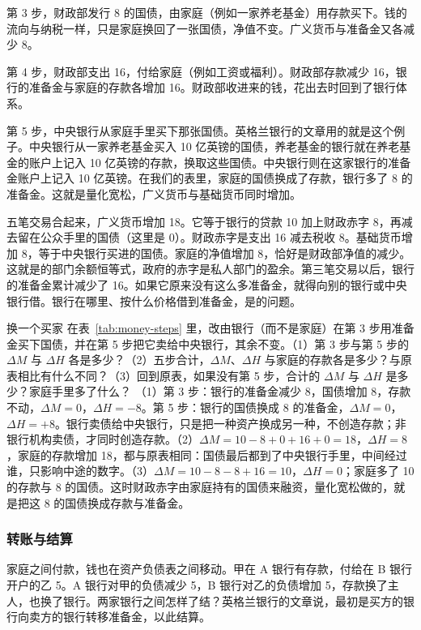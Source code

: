 第 3 步，财政部发行 8 的国债，由家庭（例如一家养老基金）用存款买下。钱的流向与纳税一样，只是家庭换回了一张国债，净值不变。广义货币与准备金又各减少 8。

第 4 步，财政部支出 16，付给家庭（例如工资或福利）。财政部存款减少 16，银行的准备金与家庭的存款各增加 16。财政部收进来的钱，花出去时回到了银行体系。

第 5 步，中央银行从家庭手里买下那张国债。英格兰银行的文章用的就是这个例子。中央银行从一家养老基金买入 10 亿英镑的国债，养老基金的银行就在养老基金的账户上记入 10 亿英镑的存款，换取这些国债。中央银行则在这家银行的准备金账户上记入 10 亿英镑\cite{mcleay2014}。在我们的表里，家庭的国债换成了存款，银行多了 8 的准备金。这就是量化宽松，广义货币与基础货币同时增加。

五笔交易合起来，广义货币增加 18。它等于银行的贷款 10 加上财政赤字 8，再减去留在公众手里的国债（这里是 0）。财政赤字是支出 16 减去税收 8。基础货币增加 8，等于中央银行买进的国债。家庭的净值增加 8，恰好是财政部净值的减少。这就是的部门余额恒等式，政府的赤字是私人部门的盈余。第三笔交易以后，银行的准备金累计减少了 16。如果它原来没有这么多准备金，就得向别的银行或中央银行借。银行在哪里、按什么价格借到准备金，是的问题。

\begin{example}{换一个买家}\label{ex:money-tax}
在表~\ref{tab:money-steps} 里，改由银行（而不是家庭）在第 3 步用准备金买下国债，并在第 5 步把它卖给中央银行，其余不变。（1）第 3 步与第 5 步的 $\Delta M$ 与 $\Delta H$ 各是多少？（2）五步合计，$\Delta M$、$\Delta H$ 与家庭的存款各是多少？与原表相比有什么不同？（3）回到原表，如果没有第 5 步，合计的 $\Delta M$ 与 $\Delta H$ 是多少？家庭手里多了什么？
\solution （1）第 3 步：银行的准备金减少 8，国债增加 8，存款不动，$\Delta M=0$，$\Delta H=-8$。第 5 步：银行的国债换成 8 的准备金，$\Delta M=0$，$\Delta H=+8$。银行卖债给中央银行，只是把一种资产换成另一种，不创造存款；非银行机构卖债，才同时创造存款。（2）$\Delta M=10-8+0+16+0=18$，$\Delta H=8$，家庭的存款增加 18，都与原表相同：国债最后都到了中央银行手里，中间经过谁，只影响中途的数字。（3）$\Delta M=10-8-8+16=10$，$\Delta H=0$；家庭多了 10 的存款与 8 的国债。这时财政赤字由家庭持有的国债来融资，量化宽松做的，就是把这 8 的国债换成存款与准备金。
\end{example}

\subsubsection{转账与结算}
家庭之间付款，钱也在资产负债表之间移动。甲在 A 银行有存款，付给在 B 银行开户的乙 5。A 银行对甲的负债减少 5，B 银行对乙的负债增加 5，存款换了主人，也换了银行。两家银行之间怎样了结？英格兰银行的文章说，最初是买方的银行向卖方的银行转移准备金，以此结算\cite{mcleay2014}。


